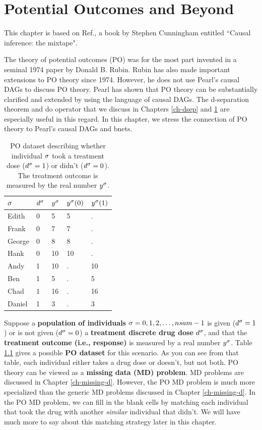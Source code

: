 \chapter{Potential Outcomes and Beyond}
\label{ch-pot-out}
This chapter
is based on Ref.\cite{book-mixtape},
a book by Stephen Cunningham entitled 
``Causal inference: the mixtape".

The theory of potential
outcomes (PO) was for the most part
invented in a seminal
1974 paper by Donald B. Rubin. Rubin
has also
made important extensions
to PO theory since 1974. However, he 
does not
use Pearl's causal DAGs to discuss PO theory. 
Pearl has shown that PO theory
can be substantially clarified
and extended by using
the language of causal DAGs.
The d-separation theorem and do operator
that we discuss in  Chapters \ref{ch-dsep}
and \ref{ch-pot-out}
are especially
useful in this regard.
In this chapter, we stress the
connection
of PO theory to 
Pearl's causal DAGs
and bnets.

\begin{table}[h!]
\centering
\begin{tabular}{|l|l|l|l|l|}
\hline
\rowcolor[HTML]{ECF4FF} 
$\sigma$ & $ d^\sigma$ & $ y^\sigma$ & $ y^\sigma(0)$ & $ y^\sigma(1)$ \\ \hline
Edith & 0 & 5 & 5 & . \\ \hline
Frank & 0 & 7 & 7 & . \\ \hline
George & 0 & 8 & 8 & . \\ \hline
Hank & 0 & 10 & 10 & . \\ \hline
Andy & \cellcolor[HTML]{FFFFC7}1 & 10 & . & 10 \\ \hline
Ben & \cellcolor[HTML]{FFFFC7}1 & 5 & . & 5 \\ \hline
Chad & \cellcolor[HTML]{FFFFC7}1 & 16 & . & 16 \\ \hline
Daniel & \cellcolor[HTML]{FFFFC7}1 & 3 & . & 3 \\ \hline
\end{tabular}
\caption{PO dataset describing whether
individual $\sigma$
took a treatment dose ($d^\sigma=1$)
or didn't ($d^\sigma=0$).
The 
treatment outcome
is measured by the real number $y^\sigma$.}
\label{tab-pot-out-missing}
\end{table} 

Suppose a {\bf population
of individuals} $\sigma=0,1,2, \ldots, nsam-1$
is given ($d^\sigma=1$) or is
not given ($d^\sigma=0$)
a {\bf treatment discrete drug dose} $d^\sigma$,
and that
the 
 {\bf treatment outcome (i.e., response)}
is measured by
a real number $y^\sigma$.
Table \ref{tab-pot-out-missing}
gives a possible {\bf PO dataset}
for this scenario.
As you
can see from
that table,
each individual 
either takes a drug
dose or
doesn't,
but not both.
PO theory
can be viewed as a
 {\bf  missing
data (MD) problem}. MD problems are 
discussed in
 Chapter \ref{ch-missing-d}.
However, the PO MD problem 
is much more specialized
than the generic MD problems
discussed in Chapter \ref{ch-missing-d}.
In the PO MD
problem, we can
fill
in the blank cells
by matching
each individual
that took
the drug with
another {\it similar} 
individual that didn't.
We will have much
more to say about
this matching
strategy later in this chapter.

